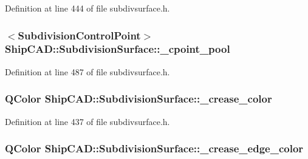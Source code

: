 Definition at line 444 of file subdivsurface.\+h.

\subsubsection[{\texorpdfstring{\+\_\+cpoint\+\_\+pool}{_cpoint_pool}}]{$<${\bf Subdivision\+Control\+Point}$>$ Ship\+C\+A\+D\+::\+Subdivision\+Surface\+::\+\_\+cpoint\+\_\+pool\hspace{0.3cm}{\ttfamily [protected]}}\hypertarget{classShipCAD_1_1SubdivisionSurface_a795f2f16f1da4aa5c0f14d441a190ce0}{}\label{classShipCAD_1_1SubdivisionSurface_a795f2f16f1da4aa5c0f14d441a190ce0}


Definition at line 487 of file subdivsurface.\+h.

\subsubsection[{\texorpdfstring{\+\_\+crease\+\_\+color}{_crease_color}}]{\setlength{\rightskip}{0pt plus 5cm}Q\+Color Ship\+C\+A\+D\+::\+Subdivision\+Surface\+::\+\_\+crease\+\_\+color\hspace{0.3cm}{\ttfamily [protected]}}\hypertarget{classShipCAD_1_1SubdivisionSurface_aaa3b772931e04f8650db2d005ae05d6a}{}\label{classShipCAD_1_1SubdivisionSurface_aaa3b772931e04f8650db2d005ae05d6a}


Definition at line 437 of file subdivsurface.\+h.

\subsubsection[{\texorpdfstring{\+\_\+crease\+\_\+edge\+\_\+color}{_crease_edge_color}}]{\setlength{\rightskip}{0pt plus 5cm}Q\+Color Ship\+C\+A\+D\+::\+Subdivision\+Surface\+::\+\_\+crease\+\_\+edge\+\_\+color\hspace{0.3cm}{\ttfamily [protected]}}\hypertarget{classShipCAD_1_1SubdivisionSurface_a6106aee9d086aa377d9a3a6a6291b54c}{}\label{classShipCAD_1_1SubdivisionSurface_a6106aee9d086aa377d9a3a6a6291b54c}


